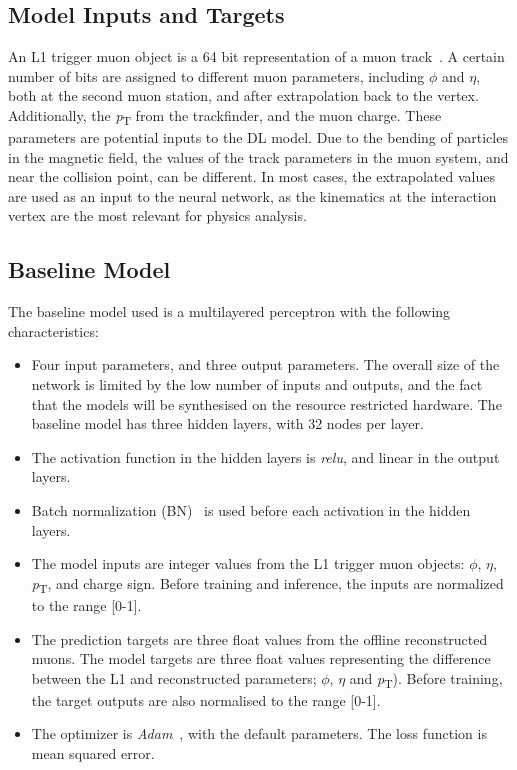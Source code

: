 \documentclass[10pt, paper=a4, UKenglish]{article}
\begin{document}
\subsection{Model Inputs and Targets}

An L1 trigger muon object is a 64 bit representation of a muon track~\cite{DN2014}. A certain number of bits are assigned to different muon parameters, including $\phi$ and $\eta$, both at the second muon station, and after extrapolation back to the vertex. Additionally, the \textit{p}\textsubscript{T} from the trackfinder, and the muon charge. These parameters are potential inputs to the DL model. Due to the bending of particles in the magnetic field, the values of the track parameters in the muon system, and near the collision point, can be different. In most cases, the extrapolated values are used as an input to the neural network, as the kinematics at the interaction vertex are the most relevant for physics analysis.

\subsection{Baseline Model}
The baseline model used is a multilayered perceptron with the following characteristics:

\begin{itemize}

    \item Four input parameters, and three output parameters. The overall size of the network is limited by the low number of inputs and outputs, and the fact that the models will be synthesised on the resource restricted hardware. The baseline model has three hidden layers, with 32 nodes per layer.
    
    \item The activation function in the hidden layers is \textit{relu}, and linear in the output layers.

    \item Batch normalization (BN)~\cite{bn} is used before each activation in the hidden layers.

    \item The model inputs are integer values from the L1 trigger muon objects: $\phi$, $\eta$, \textit{p}\textsubscript{T}, and charge sign. Before training and inference, the inputs are normalized to the range [0-1].

    \item The prediction targets are three float values from the offline reconstructed muons. The model targets are three float values representing the difference between the L1 and reconstructed parameters; $\phi$, $\eta$ and \textit{p}\textsubscript{T}). Before training, the target outputs are also normalised to the range [0-1].
    
    \item The optimizer is \textit{Adam}~\cite{Adam}, with the default parameters. The loss function is mean squared error.

\end{itemize}
\end{document}
